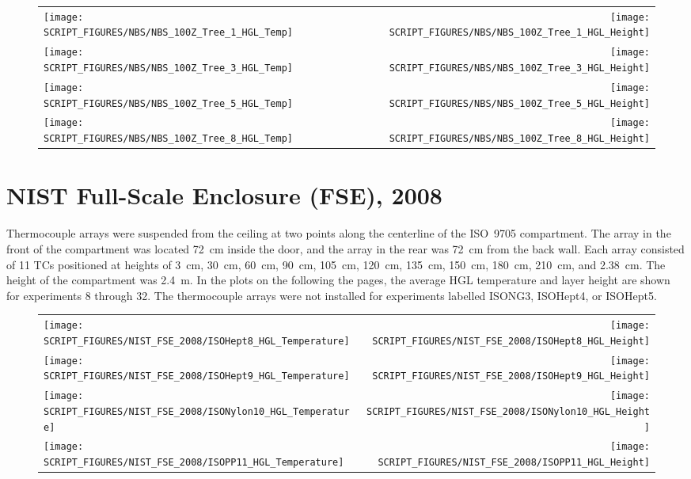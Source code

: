 \begin{figure}[p]
\begin{tabular*}{\textwidth}{l@{\extracolsep{\fill}}r}
\texttt{[image: SCRIPT\_FIGURES/NBS/NBS\_100Z\_Tree\_1\_HGL\_Temp]} &
\texttt{[image: SCRIPT\_FIGURES/NBS/NBS\_100Z\_Tree\_1\_HGL\_Height]} \\
\texttt{[image: SCRIPT\_FIGURES/NBS/NBS\_100Z\_Tree\_3\_HGL\_Temp]} &
\texttt{[image: SCRIPT\_FIGURES/NBS/NBS\_100Z\_Tree\_3\_HGL\_Height]} \\
\texttt{[image: SCRIPT\_FIGURES/NBS/NBS\_100Z\_Tree\_5\_HGL\_Temp]} &
\texttt{[image: SCRIPT\_FIGURES/NBS/NBS\_100Z\_Tree\_5\_HGL\_Height]} \\
\texttt{[image: SCRIPT\_FIGURES/NBS/NBS\_100Z\_Tree\_8\_HGL\_Temp]} &
\texttt{[image: SCRIPT\_FIGURES/NBS/NBS\_100Z\_Tree\_8\_HGL\_Height]}
\end{tabular*}
\end{figure}

\clearpage

\section{NIST Full-Scale Enclosure (FSE), 2008}

Thermocouple arrays were suspended from the ceiling at two points along the centerline of the ISO~9705 compartment. The array in the front of the compartment was located 72~cm inside the door, and the array in the rear was 72~cm from the back wall. Each array consisted of 11 TCs positioned at heights of 3~cm, 30~cm, 60~cm, 90~cm, 105~cm, 120~cm, 135~cm, 150~cm, 180~cm, 210~cm, and 2.38~cm. The height of the compartment was 2.4~m. In the plots on the following the pages, the average HGL temperature and layer height are shown for experiments 8 through 32. The thermocouple arrays were not installed for experiments labelled ISONG3, ISOHept4, or ISOHept5.

\newpage

\begin{figure}[p]
\begin{tabular*}{\textwidth}{l@{\extracolsep{\fill}}r}
\texttt{[image: SCRIPT\_FIGURES/NIST\_FSE\_2008/ISOHept8\_HGL\_Temperature]} &
\texttt{[image: SCRIPT\_FIGURES/NIST\_FSE\_2008/ISOHept8\_HGL\_Height]} \\
\texttt{[image: SCRIPT\_FIGURES/NIST\_FSE\_2008/ISOHept9\_HGL\_Temperature]} &
\texttt{[image: SCRIPT\_FIGURES/NIST\_FSE\_2008/ISOHept9\_HGL\_Height]} \\
\texttt{[image: SCRIPT\_FIGURES/NIST\_FSE\_2008/ISONylon10\_HGL\_Temperature]} &
\texttt{[image: SCRIPT\_FIGURES/NIST\_FSE\_2008/ISONylon10\_HGL\_Height]} \\
\texttt{[image: SCRIPT\_FIGURES/NIST\_FSE\_2008/ISOPP11\_HGL\_Temperature]} &
\texttt{[image: SCRIPT\_FIGURES/NIST\_FSE\_2008/ISOPP11\_HGL\_Height]}
\end{tabular*}
\label{NIST_FSE_2008_HGL_Temp_1}
\end{figure}

